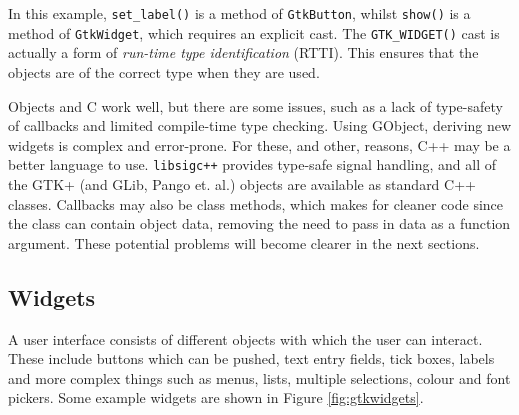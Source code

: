 \documentclass[a4paper,oneside]{article}
\newcommand{\program}[1]{\texttt{#1}}
\newcommand{\class}[1]{\texttt{#1}}
\begin{document}
\noindent In this example, \texttt{set\_label()} is a method of
\class{GtkButton}, whilst \texttt{show()} is a method of
\class{GtkWidget}, which requires an explicit cast.  The
\texttt{GTK\_WIDGET()} cast is actually a form of \emph{run-time type
  identification} (RTTI).  This ensures that the objects are of the
correct type when they are used.

Objects and C work well, but there are some issues, such as a lack of
type-safety of callbacks and limited compile-time type checking.
Using GObject, deriving new widgets is complex and error-prone.  For
these, and other, reasons, C++ may be a better language to use.
\program{libsigc++} provides type-safe signal handling, and all of the
GTK+ (and GLib, Pango et. al.) objects are available as standard C++
classes.  Callbacks may also be class methods, which makes for cleaner
code since the class can contain object data, removing the need to
pass in data as a function argument.  These potential problems will
become clearer in the next sections.


\subsection{Widgets}

A user interface consists of different objects with which the user can
interact.  These include buttons which can be pushed, text entry
fields, tick boxes, labels and more complex things such as menus,
lists, multiple selections, colour and font pickers.  Some example
widgets are shown in Figure \ref{fig:gtkwidgets}.
\end{document}
